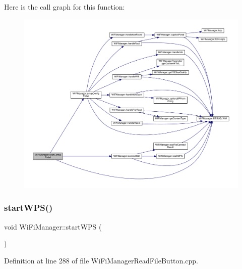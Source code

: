 Here is the call graph for this function\+:\nopagebreak
\begin{figure}[H]
\begin{center}
\leavevmode
\includegraphics[width=350pt]{class_wi_fi_manager_afaca5021edffb4d9a5bd39f7b0f7a686_cgraph}
\end{center}
\end{figure}
\mbox{\label{class_wi_fi_manager_abcc403fc26a47f7a111d1271f1d0869e}} 
\subsubsection{\texorpdfstring{start\+W\+P\+S()}{startWPS()}}
{\footnotesize\ttfamily void Wi\+Fi\+Manager\+::start\+W\+PS (\begin{DoxyParamCaption}{ }\end{DoxyParamCaption})\hspace{0.3cm}{\ttfamily [private]}}



Definition at line 288 of file Wi\+Fi\+Manager\+Read\+File\+Button.\+cpp.

